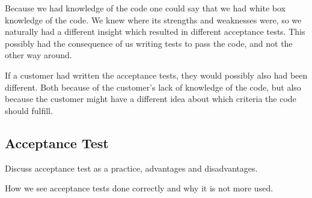 Because we had knowledge of the code one could say that we had white box knowledge of the code. We knew where its strengths and weaknesses were, so we naturally had a different insight which resulted in different acceptance tests.
This possibly had the consequence of us writing tests to pass the code, and not the other way around. 

If a customer had written the acceptance tests, they would possibly also had been different. Both because of the customer's lack of knowledge of the code, but also because the customer might have a different idea about which criteria the code should fulfill.


\subsection{Acceptance Test}
Discuss acceptance test as a practice, advantages and disadvantages.

How we see acceptance tests done correctly and why it is not more used.
